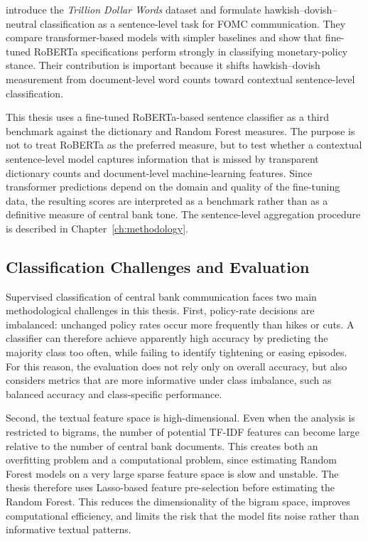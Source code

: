 \citet{shah2023} introduce the \emph{Trillion Dollar Words} dataset and
formulate hawkish--dovish--neutral classification as a sentence-level
task for FOMC communication. They compare transformer-based models with
simpler baselines and show that fine-tuned RoBERTa specifications
perform strongly in classifying monetary-policy stance. Their
contribution is important because it shifts hawkish--dovish measurement
from document-level word counts toward contextual sentence-level
classification.

This thesis uses a fine-tuned RoBERTa-based sentence classifier as a
third benchmark against the dictionary and Random Forest measures. The
purpose is not to treat RoBERTa as the preferred measure, but to test
whether a contextual sentence-level model captures information that is
missed by transparent dictionary counts and document-level
machine-learning features. Since transformer predictions depend on the
domain and quality of the fine-tuning data, the resulting scores are
interpreted as a benchmark rather than as a definitive measure of
central bank tone. The sentence-level aggregation procedure is described
in Chapter~\ref{ch:methodology}.

\subsection{Classification Challenges and Evaluation}

Supervised classification of central bank communication faces two main
methodological challenges in this thesis. First, policy-rate decisions
are imbalanced: unchanged policy rates occur more frequently than hikes
or cuts. A classifier can therefore achieve apparently high accuracy by
predicting the majority class too often, while failing to identify
tightening or easing episodes. For this reason, the evaluation does not
rely only on overall accuracy, but also considers metrics that are more
informative under class imbalance, such as balanced accuracy and
class-specific performance.

Second, the textual feature space is high-dimensional. Even when the
analysis is restricted to bigrams, the number of potential TF-IDF
features can become large relative to the number of central bank
documents. This creates both an overfitting problem and a computational
problem, since estimating Random Forest models on a very large sparse
feature space is slow and unstable. The thesis therefore uses
Lasso-based feature pre-selection before estimating the Random Forest.
This reduces the dimensionality of the bigram space, improves
computational efficiency, and limits the risk that the model fits noise
rather than informative textual patterns.

